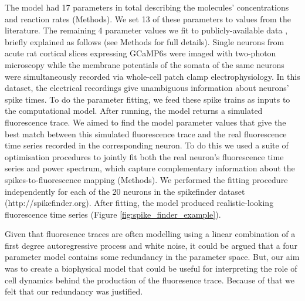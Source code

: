 The model had 17 parameters in total describing the molecules’ concentrations and reaction rates (Methods). We set 13 of these parameters to values from the literature. The remaining 4 parameter values we fit to publicly-available data  \parencite{berens}, briefly explained as follows (see Methods for full details).  Single neurons from acute rat cortical slices expressing GCaMP6s were imaged with two-photon microscopy while the membrane potentials of the somata of the same neurons were simultaneously recorded via whole-cell patch clamp electrophysiology. In this dataset, the electrical recordings give unambiguous information about neurons' spike times. To do the parameter fitting, we feed these spike trains as inputs to the computational model. After running, the model returns a simulated fluorescence trace. We aimed to find the model parameter values that give the best match between this simulated fluorescence trace and the real fluorescence time series recorded in the corresponding neuron. To do this we used a suite of optimisation procedures to jointly fit both the real neuron’s fluorescence time series and power spectrum, which capture complementary information about the spikes-to-fluorescence mapping (Methods). We performed the fitting procedure independently for each of the $20$ neurons in the spikefinder dataset (http://spikefinder.org). After fitting, the model produced realistic-looking fluorescence time series (Figure \ref{fig:spike_finder_example}).

Given that fluoresence traces are often modelling using a linear combination of a first degree autoregressive process and white noise, it could be argued that a four parameter model contains some redundancy in the parameter space. But, our aim was to create a biophysical model that could be useful for interpreting the role of cell dynamics behind the production of the fluoresence trace. Because of that we felt that our redundancy was justified.


